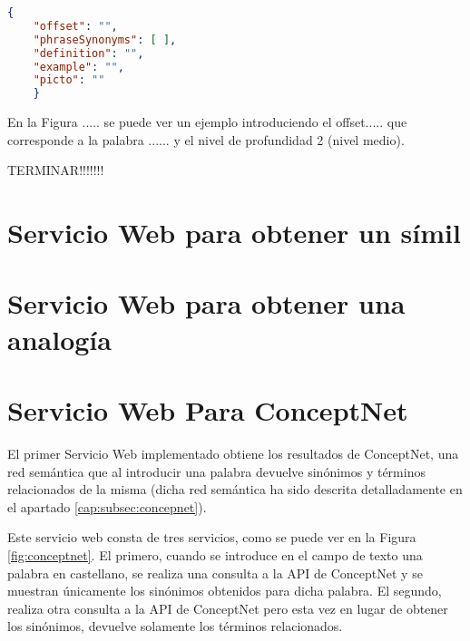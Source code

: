 \begin{lstlisting}[language=json, caption= Estructura JSON para las metáforas, label={lst:JSONhiponimofacil}, frame=single]
	{ 
	"offset": "", 
	"phraseSynonyms": [ ], 
	"definition": "", 
	"example": "", 
	"picto": ""
	}
\end{lstlisting}

En la Figura ..... se puede ver un ejemplo introduciendo el offset..... que corresponde a la palabra ...... y el nivel de profundidad 2 (nivel medio).



TERMINAR!!!!!!!
\section{Servicio Web  para obtener un símil}


\section{Servicio Web  para obtener una analogía}

\section{Servicio Web Para ConceptNet}
\label{cap:sec:servicioConceptnet}

El primer Servicio Web implementado obtiene los resultados de ConceptNet, una red semántica que al introducir una palabra devuelve sinónimos y términos relacionados de la misma (dicha red semántica ha sido descrita detalladamente en el apartado \ref{cap:subsec:concepnet}).


Este servicio web consta de tres servicios, como se puede ver en la Figura \ref{fig:conceptnet}. El primero, cuando se introduce en el campo de texto una palabra en castellano, se realiza una consulta a la API de ConceptNet y se muestran únicamente los sinónimos obtenidos para dicha palabra. El segundo, realiza otra consulta a la API de ConceptNet pero esta vez en lugar de obtener los sinónimos, devuelve solamente los términos relacionados.

